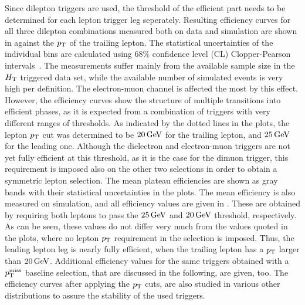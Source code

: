 Since dilepton triggers are used, the threshold of the efficient part needs to be determined for each lepton trigger leg seperately. Resulting efficiency curves for all three dilepton combinations measured both on data and simulation are shown in  against the $p_{\mathrm{T}}$ of the trailing lepton. The statistical uncertainties of the individual bins are calculated using $68\%$ confidence level (CL) Clopper-Pearson intervals~\cite{ClopperPearson}. The measurements suffer mainly from the available sample size in the $H_{\mathrm{T}}$ triggered data set, while the available number of simulated events is very high per definition. The electron-muon channel is affected the most by this effect. However, the efficiency curves show the structure of multiple transitions into efficient phases, as it is expected from a combination of triggers with very different ranges of thresholds. As indicated by the dotted lines in the plots, the lepton $p_{\mathrm{T}}$ cut was determined to be $20\,\text{Ge\hspace{-.08em}V}$ for the trailing lepton, and $25\,\text{Ge\hspace{-.08em}V}$ for the leading one. Although the dielectron and electron-muon triggers are not yet fully efficient at this threshold, as it is the case for the dimuon trigger, this requirement is imposed also on the other two selections in order to obtain a symmetric lepton selection. The mean plateau efficiencies are shown as gray bands with their statistical uncertainties in the plots. The mean efficiency is also measured on simulation, and all efficiency values are given in . These are obtained by requiring both leptons to pass the $25\,\text{Ge\hspace{-.08em}V}$ and $20\,\text{Ge\hspace{-.08em}V}$ threshold, respectively. As can be seen, these values do not differ very much from the values quoted in the plots, where no lepton $p_{\mathrm{T}}$ requirement in the selection is imposed. Thus, the leading lepton leg is nearly fully efficient, when the trailing lepton has a $p_{\mathrm{T}}$ larger than $20\,\text{Ge\hspace{-.08em}V}$. Additional efficiency values for the same triggers obtained with a $p_{\mathrm{T}}^\text{miss}$ baseline selection, that are discussed in the following, are given, too.
The efficiency curves after applying the $p_{\mathrm{T}}$ cuts, are also studied in various other distributions to assure the stability of the used triggers.

